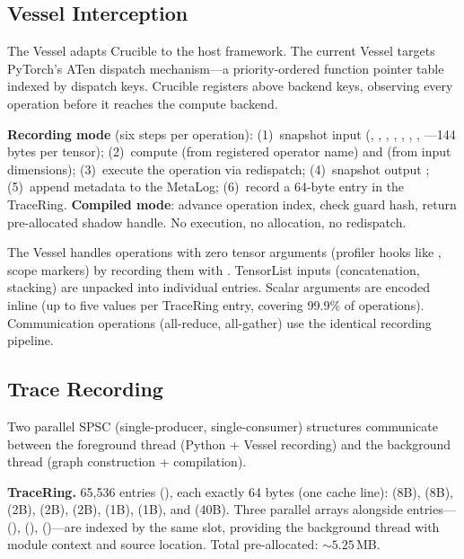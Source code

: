 \subsection{Vessel Interception}

The Vessel adapts Crucible to the host framework.
The current Vessel targets PyTorch's ATen dispatch mechanism---a priority-ordered function pointer table indexed by dispatch keys.
Crucible registers  above backend keys, observing every operation before it reaches the compute backend.

\textbf{Recording mode} (six steps per operation):
(1)~snapshot input  (, , , , , , , ---144 bytes per tensor);
(2)~compute  (from registered operator name) and  (from input dimensions);
(3)~execute the operation via redispatch;
(4)~snapshot output ;
(5)~append metadata to the MetaLog;
(6)~record a 64-byte entry in the TraceRing.
\textbf{Compiled mode}: advance operation index, check guard hash, return pre-allocated shadow handle.
No execution, no allocation, no redispatch.

The Vessel handles operations with zero tensor arguments (profiler hooks like , scope markers) by recording them with .
TensorList inputs (concatenation, stacking) are unpacked into individual  entries.
Scalar arguments are encoded inline (up to five  values per TraceRing entry, covering 99.9\% of operations).
Communication operations (all-reduce, all-gather) use the identical recording pipeline.

\subsection{Trace Recording}

Two parallel SPSC (single-producer, single-consumer) structures communicate between the foreground thread (Python + Vessel recording) and the background thread (graph construction + compilation).

\textbf{TraceRing.}
65,536 entries (), each exactly 64 bytes (one cache line):  (8B),  (8B),  (2B),  (2B),  (2B),  (1B),  (1B), and  (40B).
Three parallel arrays alongside entries--- (),  (),  ()---are indexed by the same slot, providing the background thread with module context and source location.
Total pre-allocated: ${\sim}5.25$\,MB.


